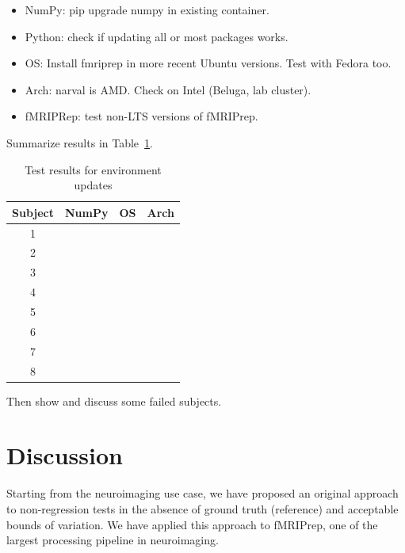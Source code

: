 \documentclass{article}
\begin{document}
\begin{itemize}
    \item NumPy: pip upgrade numpy in existing container.
    \item Python: check if updating all or most packages works.
    \item OS: Install fmriprep in more recent Ubuntu versions. Test with Fedora
          too.
    \item Arch: narval is AMD. Check on Intel (Beluga, lab cluster).
    \item fMRIPRep: test non-LTS versions of fMRIPrep.
\end{itemize}

Summarize results in Table~\ref{table:environment-updates}.
\begin{table}
    \begin{center}
        \begin{tabular}{cccc}
            Subject & NumPy                & OS                 & Arch                 \\
            \hline
            1       & \cellcolor{green!25} & \cellcolor{red!25} & \cellcolor{green!25} \\
            2       & \cellcolor{green!25} & \cellcolor{red!25} & \cellcolor{green!25} \\
            3       & \cellcolor{green!25} & \cellcolor{red!25} & \cellcolor{green!25} \\
            4       & \cellcolor{green!25} & \cellcolor{red!25} & \cellcolor{green!25} \\
            5       & \cellcolor{green!25} & \cellcolor{red!25} & \cellcolor{green!25} \\
            6       & \cellcolor{green!25} & \cellcolor{red!25} & \cellcolor{green!25} \\
            7       & \cellcolor{green!25} & \cellcolor{red!25} & \cellcolor{green!25} \\
            8       & \cellcolor{green!25} & \cellcolor{red!25} & \cellcolor{green!25} \\
        \end{tabular}
        \caption{Test results for environment updates}
        \label{table:environment-updates}
    \end{center}
\end{table}
Then show and discuss some failed subjects.


\section{Discussion}
Starting from the neuroimaging use case, we have proposed an original approach
to non-regression tests in the absence of ground truth (reference) and
acceptable bounds of variation. We have applied this approach to fMRIPrep, one
of the largest processing pipeline in neuroimaging.
\end{document}
